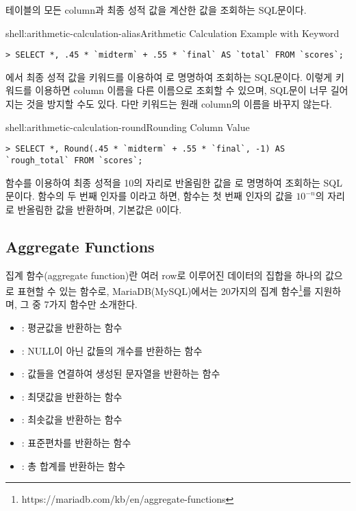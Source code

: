 \은  테이블의 모든 column과 최종 성적 값을 계산한 값을 조회하는 SQL문이다.

\begin{shellenv}{shell:arithmetic-calculation-alias}{Arithmetic Calculation Example with  Keyword}\begin{verbatim}
> SELECT *, .45 * `midterm` + .55 * `final` AS `total` FROM `scores`;
\end{verbatim}
\end{shellenv}

\은 에서 최종 성적 값을  키워드를 이용하여 로 명명하여 조회하는 SQL문이다. 이렇게  키워드를 이용하면 column 이름을 다른 이름으로 조회할 수 있으며, SQL문이 너무 길어지는 것을 방지할 수도 있다. 다만  키워드는 원래 column의 이름을 바꾸지 않는다.

\begin{shellenv}{shell:arithmetic-calculation-round}{Rounding Column Value}\begin{verbatim}
> SELECT *, Round(.45 * `midterm` + .55 * `final`, -1) AS `rough_total` FROM `scores`;
\end{verbatim}
\end{shellenv}

\는  함수를 이용하여 최종 성적을 10의 자리로 반올림한 값을 로 명명하여 조회하는 SQL문이다.  함수의 두 번째 인자를 이라고 하면,  함수는 첫 번째 인자의 값을 $10^{-n}$의 자리로 반올림한 값을 반환하며, 기본값은 0이다.

\subsection*{Aggregate Functions}

집계 함수(aggregate function)란 여러 row로 이루어진 데이터의 집합을 하나의 값으로 표현할 수 있는 함수로, MariaDB(MySQL)에서는 20가지의 집계 함수\footnote{https://mariadb.com/kb/en/aggregate-functions}를 지원하며, 그 중 7가지 함수만 소개한다.

\begin{itemize}
    \item {}: 평균값을 반환하는 함수
    \item {}: NULL이 아닌 값들의 개수를 반환하는 함수
    \item {}: 값들을 연결하여 생성된 문자열을 반환하는 함수
    \item {}: 최댓값을 반환하는 함수
    \item {}: 최솟값을 반환하는 함수
    \item {}: 표준편차를 반환하는 함수
    \item {}: 총 합계를 반환하는 함수
\end{itemize}

